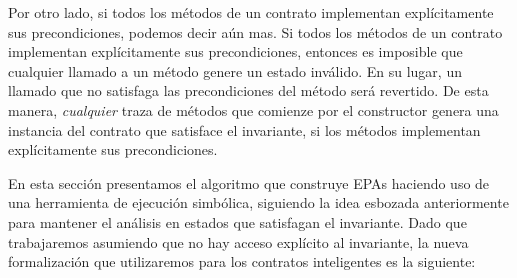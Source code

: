 Por otro lado, si todos los métodos de un contrato implementan explícitamente sus precondiciones, podemos decir aún mas.
Si todos los métodos de un contrato implementan explícitamente sus precondiciones, entonces es imposible que cualquier llamado a un método genere un estado inválido.
En su lugar, un llamado que no satisfaga las precondiciones del método será revertido.
De esta manera, \textit{cualquier} traza de métodos que comienze por el constructor genera una instancia del contrato que satisface el invariante, si los métodos implementan explícitamente sus precondiciones.

En esta sección presentamos el algoritmo que construye EPAs haciendo uso de una herramienta de ejecución simbólica, siguiendo la idea esbozada anteriormente para mantener el análisis en estados que satisfagan el invariante.
Dado que trabajaremos asumiendo que no hay acceso explícito al invariante, la nueva formalización que utilizaremos para los contratos inteligentes es la siguiente:

